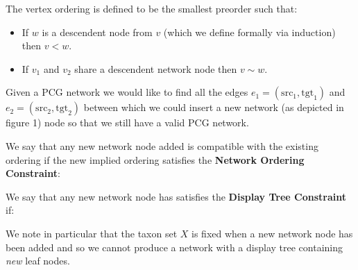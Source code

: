 \documentclass[11pt]{article}
\begin{document}
\noindent The vertex ordering is defined to be the smallest preorder such that:
\begin{itemize}
\item If $w$ is a descendent node from $v$ (which we define formally via induction) then $v < w$.
\item If $v_1$ and $v_2$ share a descendent network node then $v \sim w$.
\end{itemize}

\vspace{2mm}


Given a PCG network we would like to find all the edges $e_1= (\mathrm{src}_1, \mathrm{tgt}_1)$ and $e_2 = (\mathrm{src}_2, \mathrm{tgt}_2)$ between which we could insert a new network (as depicted in figure 1) node so that we still have a valid PCG network.

We say that any new network node added is compatible with the existing ordering if the new implied ordering satisfies the \textbf{Network Ordering Constraint}:

\vspace{4mm}
\vspace{4mm}

We say that any new network node has satisfies the \textbf{Display Tree Constraint} if:

\vspace{4mm}
\vspace{4mm}

\noindent We note in particular that the taxon set $X$ is fixed when a new network node has been added and so we cannot produce a network with a display tree containing \textit{new} leaf nodes.
\end{document}
